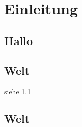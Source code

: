 \chapter{Einleitung}\label{cha:Einleitung}
\section{Hallo}\label{sec:Halloe}

\blindtext[20]


\section{Welt}\label{sec:Halloe2}


siehe \ref{sec:Halloe}


\blindtext[20]


\section{Welt}\label{sec:Welte}

\blindtext[20]

